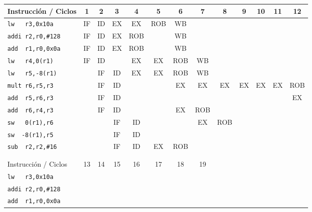 \begin{ejercicio}
    \begin{table}
        \centering
        \scriptsize
        \begin{tabular}{|l|c|c|c|c|c|c|c|c|c|c|c|c|}
            \hline
            Instrucción / Ciclos & 1 & 2 & 3 & 4 & 5 & 6 & 7 & 8 & 9 & 10 & 11 & 12 \\
            \hline
            \verb|lw   r3,0x10a|        & IF & ID & EX & EX & ROB & WB & & & & & &\\
            \hline        
            \verb|addi r2,r0,#128|      & IF & ID & EX & ROB & & WB & & & & & &\\
            \hline           
            \verb|add  r1,r0,0x0a|      & IF & ID & EX & ROB & &  WB & & & & & & \\
            \hline                        
            \verb|lw   r4,0(r1)|        & IF & ID & & EX & EX & ROB & WB & & & & & \\
            \hline            
            \verb|lw   r5,-8(r1)|       & & IF & ID & EX & EX & ROB & WB & & & && \\
            \hline
            \verb|mult r6,r5,r3|        & & IF & ID & & & EX & EX & EX & EX & EX & EX & ROB\\
            \hline
            \verb|add  r5,r6,r3|        & & IF & ID & & & & & & & & & EX\\
            \hline
            \verb|add  r6,r4,r3|        & & IF & ID & & & EX & ROB & & & & &\\
            \hline            
            \verb|sw   0(r1),r6|        & & & IF & ID & & & EX & ROB & & & & \\
            \hline
            \verb|sw  -8(r1),r5|        & & & IF & ID & & & & & & & &\\
            \hline
            \verb|sub  r2,r2,#16|       & & & IF & ID & EX & ROB & & & & & & \\
            \hline \\ \hline \\ \hline
            \hline
            Instrucción / Ciclos & 13 & 14 & 15 & 16 & 17 & 18 & 19 \\
            \hline
            \verb|lw   r3,0x10a|        & & & & & & &\\
            \hline        
            \verb|addi r2,r0,#128|      & & & & & & &\\
            \hline           
            \verb|add  r1,r0,0x0a|      & & & & & & &\\
            \hline                        

\end{tabular}
\end{table}
\end{ejercicio}
